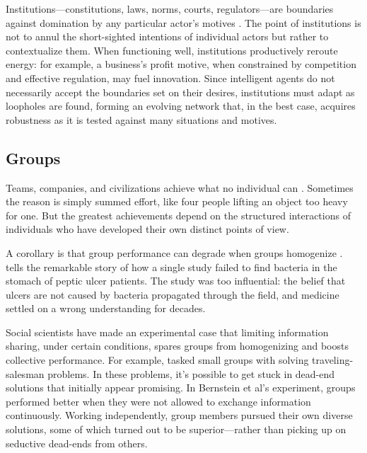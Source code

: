 \documentclass[11pt]{article}
\begin{document}
Institutions---constitutions, laws, norms, courts, regulators---are boundaries against domination by any particular actor's motives \citep{north1990institutions, ostrom1990governing, leibo2025societal}. The point of institutions is not to annul the short-sighted intentions of individual actors but rather to contextualize them. When functioning well, institutions productively reroute energy: for example, a business's profit motive, when constrained by competition and effective regulation, may fuel innovation. Since intelligent agents do not necessarily accept the boundaries set on their desires, institutions must adapt as loopholes are found, forming an evolving network that, in the best case, acquires robustness as it is tested against many situations and motives.


\subsection{Groups} 

Teams, companies, and civilizations achieve what no individual can \citep{woolley2010evidence, hutchins1995cognition}. Sometimes the reason is simply summed effort, like four people lifting an object too heavy for one. But the greatest achievements depend on the structured interactions of individuals who have developed their own distinct points of view.

A corollary is that group performance can degrade when groups homogenize \citep{lorenz2011social, lazer2007network, hong2004groups, frey2021social, janis1972victims, bernstein2018intermittent}. \cite{zollman2010epistemic} tells the remarkable story of how a single study failed to find bacteria in the stomach of peptic ulcer patients. The study was too influential: the belief that ulcers are not caused by bacteria propagated through the field, and medicine settled on a wrong understanding for decades.

Social scientists have made an experimental case that limiting information sharing, under certain conditions, spares groups from homogenizing and boosts collective performance. For example, \cite{bernstein2018intermittent} tasked small groups with solving traveling-salesman problems. In these problems, it's possible to get stuck in dead-end solutions that initially appear promising. In Bernstein et al's experiment, groups performed better when they were not allowed to exchange information continuously. Working independently, group members pursued their own diverse solutions, some of which turned out to be superior---rather than picking up on seductive dead-ends from others.
\end{document}
